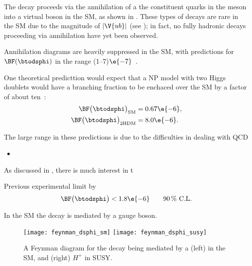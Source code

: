 The decay \btodsphi proceeds via the annihilation of a the constituent quarks in the \Bp meson into
a virtual \Wp boson in the SM, as shown in .
These types of decays are rare in the SM due to the magnitude of $|\V{ub}|$ (see );
in fact, no fully hadronic decays proceeding via annihilation have yet been observed.


Annihilation diagrams are heavily suppressed in the SM, with predictions for $\BF(\btodsphi)$ in
the range (1--7)$\e{-7}$~\cite{Zou:2009zza,Mohanta:2002wf,PhysRevD.76.057701,Lu:2001yz}.



One theoretical predicttion would expect that a NP model with two Higgs doublets would have a
branching fraction to be enchaced over the SM by a factor of about ten~\cite{Mohanta:2002wf}:
\begin{align}
  \BF\big(\btodsphi\big)_\mathrm{SM}&=0.67\e{-6}, \\
  \BF\big(\btodsphi\big)_\mathrm{2HDM}&=8.0\e{-6}.
\end{align}


The large range in these predictions is due to the difficulties in dealing with QCD
\begin{itemize}
  \item
\end{itemize}



As discussed in , there is much interest in t

Previous experimental limit by \babar \cite{Aubert:2005gd}
\begin{equation}
  \BF\big(\btodsphi\big) < 1.8\e{-6} \qquad \text{90\,\% C.L.}
\end{equation}


In the SM the decay is mediated by a \Wp gauge boson.

\begin{figure}
  \begin{center}
    \texttt{[image: feynman\_dsphi\_sm]}
    \texttt{[image: feynman\_dsphi\_susy]}
    \caption[Feynman diagram for the decay \btodsphi]
    {\small
      A Feynman diagram for the decay \btodsphi being mediated by a
      (left) \Wp in the SM, and
      (right) $H^+$ in SUSY.
    }
    \label{fig:dsphi:feyn}
  \end{center}
\end{figure}



